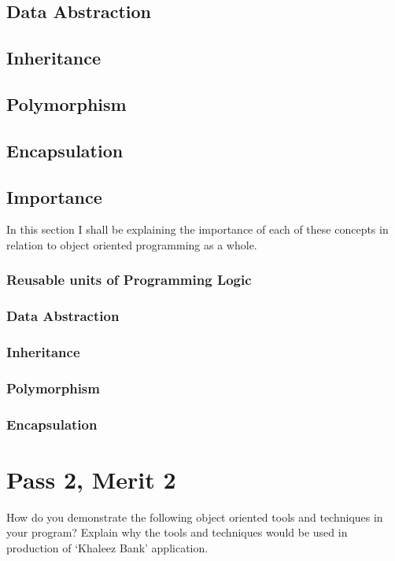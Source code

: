 \documentclass[twocolumn, twoside, titlepage]{article}
\begin{document}
\subsection{Data Abstraction}

\subsection{Inheritance}

\subsection{Polymorphism}

\subsection{Encapsulation}

\subsection{Importance}
In this section I shall be explaining the importance of each of these concepts in relation to object oriented programming as a whole.
\subsubsection{Reusable units of Programming Logic}

\subsubsection{Data Abstraction}

\subsubsection{Inheritance}

\subsubsection{Polymorphism}

\subsubsection{Encapsulation}


\section{Pass 2, Merit 2}
How do you demonstrate the following object oriented tools and techniques in your program? Explain why the tools and techniques would be used in production of ‘Khaleez Bank’ application.
\end{document}
